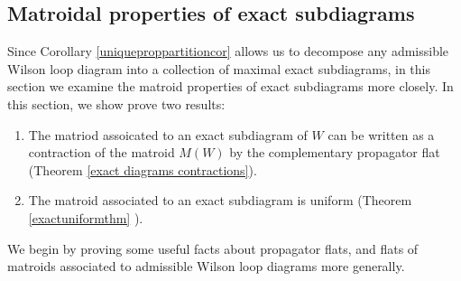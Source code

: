 \documentclass[11pt]{article}
\theoremstyle{remark}
\theoremstyle{definition}
\begin{document}
\subsection{Matroidal properties of exact subdiagrams \label{sec: exact diagram matroidal props}}

Since Corollary \ref{uniqueproppartitioncor} allows us to decompose any admissible Wilson loop diagram into a collection of maximal exact subdiagrams, in this section we examine the matroid properties of exact subdiagrams more closely. In this section, we show prove two results:
\begin{enumerate}
\item The matriod assoicated to an exact subdiagram of $W$ can be written as a contraction of the matroid $M(W)$ by the complementary propagator flat (Theorem \ref{exact diagrams contractions}). 
\item The matroid associated to an exact subdiagram is uniform (Theorem \ref{exactuniformthm} ).
\end{enumerate}

We begin by proving some useful facts about propagator flats, and flats of matroids associated to admissible Wilson loop diagrams more generally.
\end{document}
